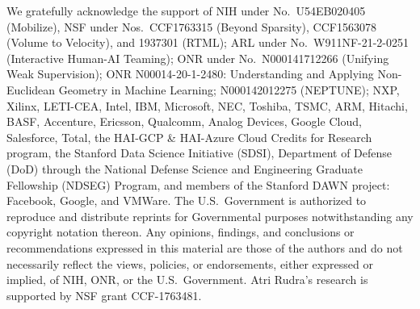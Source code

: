 We gratefully acknowledge the support of NIH under No.\ U54EB020405 (Mobilize), NSF under Nos.\ CCF1763315 (Beyond Sparsity), CCF1563078 (Volume to Velocity), and 1937301 (RTML); ARL under No.\ W911NF-21-2-0251 (Interactive Human-AI Teaming); ONR under No.\ N000141712266 (Unifying Weak Supervision); ONR N00014-20-1-2480: Understanding and Applying Non-Euclidean Geometry in Machine Learning; N000142012275 (NEPTUNE); NXP, Xilinx, LETI-CEA, Intel, IBM, Microsoft, NEC, Toshiba, TSMC, ARM, Hitachi, BASF, Accenture, Ericsson, Qualcomm, Analog Devices, Google Cloud, Salesforce, Total, the HAI-GCP \& HAI-Azure Cloud Credits for Research program,  the Stanford Data Science Initiative (SDSI), Department of Defense (DoD) through the National Defense Science and Engineering Graduate Fellowship (NDSEG) Program, and members of the Stanford DAWN project: Facebook, Google, and VMWare. The U.S.\ Government is authorized to reproduce and distribute reprints for Governmental purposes notwithstanding any copyright notation thereon. Any opinions, findings, and conclusions or recommendations expressed in this material are those of the authors and do not necessarily reflect the views, policies, or endorsements, either expressed or implied, of NIH, ONR, or the U.S.\ Government. Atri Rudra’s research is supported by NSF grant CCF-1763481.


